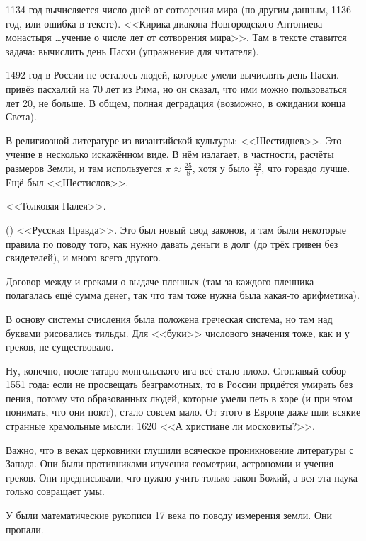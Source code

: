 \documentclass[a4paper,oneside,fleqn,10pt]{article}
\begin{document}
1134 год вычисляется число дней от сотворения мира (по другим данным,
1136 год, или ошибка в тексте). <<Кирика диакона Новгородского
Антониева монастыря \ldots учение о числе лет от сотворения
мира>>. Там в тексте ставится задача: вычислить день Пасхи (упражнение
для читателя).

1492 год в России не осталось людей, которые умели вычислять день
Пасхи.   привёз пасхалий на
70 лет из Рима, но он сказал, что ими можно пользоваться лет 20, не
больше.  В общем, полная деградация (возможно, в ожидании конца
Света).

В религиозной литературе из византийской культуры: <<Шестиднев>>. Это
учение  в несколько искажённом виде.  В
нём  излагает, в частности, расчёты
размеров Земли, и там используется $\pi \approx \frac{25}{8}$, хотя у
 было $\frac{22}{7}$, что гораздо лучше. Ещё
был <<Шестислов>>.

<<Толковая Палея>>.

 () <<Русская Правда>>. Это был
новый свод законов, и там были некоторые правила по поводу того, как
нужно давать деньги в долг (до трёх гривен без свидетелей), и много
всего другого.

Договор между  и греками о выдаче пленных
(там за каждого пленника полагалась ещё сумма денег, так что там тоже
нужна была какая-то арифметика).

В основу системы счисления была положена греческая система, но там над
буквами рисовались тильды.  Для <<буки>> числового значения тоже, как
и у греков, не существовало.

Ну, конечно, после татаро монгольского ига всё стало плохо.  Стоглавый
собор 1551 года: если не просвещать безграмотных, то в России придётся
умирать без пения, потому что образованных людей, которые умели петь в
хоре (и при этом понимать, что они поют), стало совсем мало.  От этого
в Европе даже шли всякие странные крамольные мысли: 1620  <<А христиане ли московиты?>>.

Важно, что в  веках церковники глушили всяческое
проникновение литературы с Запада.  Они были противниками изучения
геометрии, астрономии и учения греков. Они предписывали, что нужно
учить только закон Божий, а вся эта наука только совращает умы.

У  были математические рукописи 17 века по
поводу измерения земли.  Они пропали.
\end{document}
